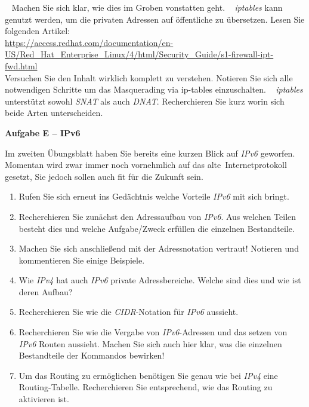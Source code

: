 \documentclass[paper=a4,fontsize=11pt]{scrartcl}%
\numberwithin{equation}{section}
\begin{document}
\begin{enumerate}
\begin{tasks}
		\task~ Machen Sie sich klar, wie dies im Groben vonstatten geht.
		\task~ \emph{iptables} kann genutzt werden, um die privaten Adressen auf öffentliche zu übersetzen. Lesen Sie folgenden Artikel:\\
		\url{https://access.redhat.com/documentation/en-US/Red_Hat_Enterprise_Linux/4/html/Security_Guide/s1-firewall-ipt-fwd.html}\\
		Versuchen Sie den Inhalt wirklich komplett zu verstehen. Notieren Sie sich alle notwendigen Schritte um das Masquerading via ip-tables einzuschalten.
		\task~ \emph{iptables} unterstützt sowohl \emph{SNAT} als auch \emph{DNAT}. Recherchieren Sie kurz worin sich beide Arten unterscheiden.
	\end{tasks}
\end{enumerate}
\begin{center}\Large{\textbf{Aufgabe E -- IPv6}}\end{center}\vskip0.25in
Im zweiten Übungsblatt haben Sie bereits eine kurzen Blick auf \emph{IPv6} geworfen. Momentan wird zwar immer noch vornehmlich auf das \glqq alte\grqq\ Internetprotokoll gesetzt, Sie jedoch sollen auch fit für die Zukunft sein.
\begin{enumerate}
	\item Rufen Sie sich erneut ins Gedächtnis welche Vorteile \emph{IPv6} mit sich bringt.
	\item Recherchieren Sie zunächst den Adressaufbau von \emph{IPv6}. Aus welchen Teilen besteht dies und welche Aufgabe/Zweck erfüllen die einzelnen Bestandteile.
	\item Machen Sie sich anschließend mit der Adressnotation vertraut! Notieren und kommentieren Sie einige Beispiele.
	\item Wie \emph{IPv4} hat auch \emph{IPv6} private Adressbereiche. Welche sind dies und wie ist deren Aufbau?
	\item Recherchieren Sie wie die \emph{CIDR}-Notation für \emph{IPv6} aussieht.
	\item Recherchieren Sie wie die Vergabe von \emph{IPv6}-Adressen und das setzen von \emph{IPv6} Routen aussieht. Machen Sie sich auch hier klar, was die einzelnen Bestandteile der Kommandos bewirken!
	\item Um das Routing zu ermöglichen benötigen Sie genau wie bei \emph{IPv4} eine Routing-Tabelle. Recherchieren Sie entsprechend, wie das Routing zu aktivieren ist.
\end{enumerate}
\end{document}
